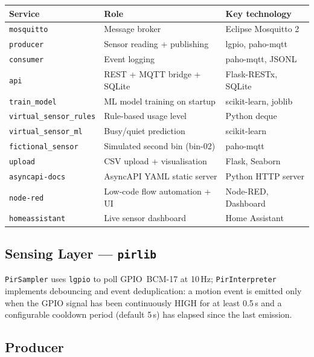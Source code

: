 \documentclass[10pt,a4paper]{article}
\begin{document}
\begin{center}
\begin{tabular}{@{}lll@{}}
\toprule
\textbf{Service} & \textbf{Role} & \textbf{Key technology} \\
\midrule
\texttt{mosquitto}            & Message broker                   & Eclipse Mosquitto 2 \\
\texttt{producer}             & Sensor reading + publishing      & lgpio, paho-mqtt \\
\texttt{consumer}             & Event logging                    & paho-mqtt, JSONL \\
\texttt{api}                  & REST + MQTT bridge + SQLite      & Flask-RESTx, SQLite \\
\texttt{train\_model}         & ML model training on startup     & scikit-learn, joblib \\
\texttt{virtual\_sensor\_rules} & Rule-based usage level         & Python deque \\
\texttt{virtual\_sensor\_ml}  & Busy/quiet prediction            & scikit-learn \\
\texttt{fictional\_sensor}    & Simulated second bin (bin-02)    & paho-mqtt \\
\texttt{upload}               & CSV upload + visualisation       & Flask, Seaborn \\
\texttt{asyncapi-docs}        & AsyncAPI YAML static server      & Python HTTP server \\
\texttt{node-red}             & Low-code flow automation + UI    & Node-RED, Dashboard \\
\texttt{homeassistant}        & Live sensor dashboard            & Home Assistant \\
\bottomrule
\end{tabular}
\end{center}

\subsection{Sensing Layer --- \texttt{pirlib}}

\texttt{PirSampler} uses
\texttt{lgpio} to poll GPIO~BCM-17 at 10\,Hz;
\texttt{PirInterpreter}
implements debouncing and event deduplication: a motion event is emitted only when the
GPIO signal has been continuously HIGH for at least 0.5\,s and a configurable cooldown
period (default 5\,s) has elapsed since the last emission.

\subsection{Producer}
\end{document}
